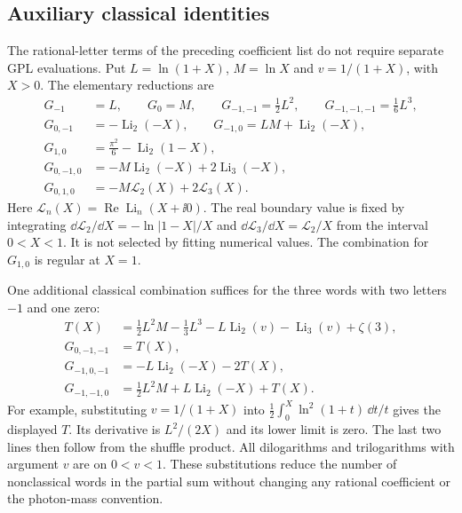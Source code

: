 \subsection{Auxiliary classical identities}
The rational-letter terms of the preceding coefficient list do not
require separate GPL evaluations. Put $L=\ln(1+X)$, $M=\ln X$ and
$v=1/(1+X)$, with $X>0$. The elementary reductions are
\begin{align}
 G_{-1}&=L,\qquad G_0=M,\qquad
 G_{-1,-1}=\tfrac12L^2,\qquad G_{-1,-1,-1}=\tfrac16L^3,\\
 G_{0,-1}&=-\operatorname{Li}_2(-X),\qquad
 G_{-1,0}=LM+\operatorname{Li}_2(-X),\\
 G_{1,0}&=\frac{\pi^2}{6}-\operatorname{Li}_2(1-X),\\
 G_{0,-1,0}&=-M\operatorname{Li}_2(-X)+2\operatorname{Li}_3(-X),\\
 G_{0,1,0}&=-M\mathcal L_2(X)+2\mathcal L_3(X).
\end{align}
Here $\mathcal L_n(X)=\operatorname{Re}\operatorname{Li}_n(X+\ii0)$.
The real boundary value is fixed by integrating
$\dd\mathcal L_2/\dd X=-\ln|1-X|/X$ and
$\dd\mathcal L_3/\dd X=\mathcal L_2/X$ from the interval $0<X<1$.
It is not selected by fitting numerical values. The combination
for $G_{1,0}$ is regular at $X=1$.

One additional classical combination suffices for the three words
with two letters $-1$ and one zero:
\begin{align}
 T(X)&=\tfrac12L^2M-\tfrac13L^3
       -L\operatorname{Li}_2(v)-\operatorname{Li}_3(v)+\zeta(3),\\
 G_{0,-1,-1}&=T(X),\\
 G_{-1,0,-1}&=-L\operatorname{Li}_2(-X)-2T(X),\\
 G_{-1,-1,0}&=\tfrac12L^2M+L\operatorname{Li}_2(-X)+T(X).
\end{align}
For example, substituting $v=1/(1+X)$ into
$\tfrac12\int_0^X\ln^2(1+t)\,\dd t/t$ gives the displayed $T$.
Its derivative is $L^2/(2X)$ and its lower limit is zero.
The last two lines then follow from the shuffle product.
All dilogarithms and trilogarithms with argument $v$ are on
$0<v<1$. These substitutions reduce the number of nonclassical
words in the partial sum without changing any rational coefficient
or the photon-mass convention.

